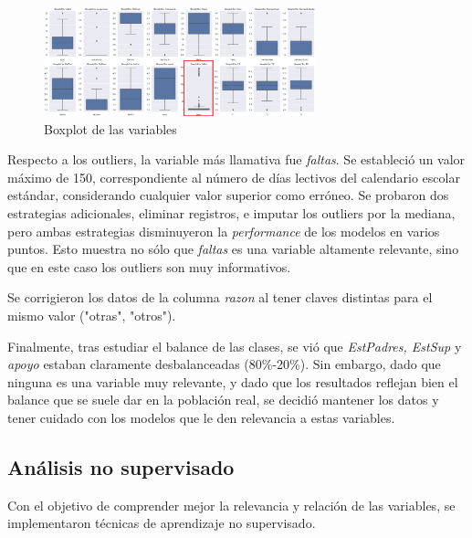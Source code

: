 \documentclass{article}
\begin{document}
\begin{figure}[ht]
  \centering
  \includegraphics[width=0.7\textwidth]{Boxplot_Outliers.png}
  \caption{Boxplot de las variables}\label{fig:boxplot}
\end{figure}



Respecto a los outliers, la variable más llamativa fue \textit{faltas}. Se estableció un valor máximo de 150, correspondiente al número de días lectivos del calendario escolar estándar, considerando 
cualquier valor superior como erróneo. Se probaron dos estrategias adicionales, eliminar registros, e imputar los outliers por la mediana, pero ambas estrategias disminuyeron la 
\textit{performance} de los modelos en varios puntos. Esto muestra no sólo que \textit{faltas} es una variable altamente relevante, sino que en este caso los outliers son muy informativos.

Se corrigieron los datos de la columna \textit{razon} al tener claves distintas para el mismo valor ("otras", "otros").

Finalmente, tras estudiar el balance de las clases, se vió que \textit{EstPadres, EstSup} y \textit{apoyo} estaban claramente desbalanceadas (80\%-20\%). Sin embargo, dado que ninguna es una variable
muy relevante, y dado que los resultados reflejan bien el balance que se suele dar en la población real, se decidió mantener los datos y tener cuidado con los modelos que le den relevancia a estas variables.

\subsection{Análisis no supervisado}


Con el objetivo de comprender mejor la relevancia y relación de las variables, se implementaron técnicas de aprendizaje no supervisado. 
\end{document}
